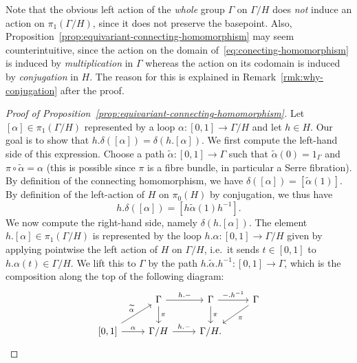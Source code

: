 \documentclass[AHL,Unicode,published]{cedram}
\begin{document}
\begin{rema}\label{rmk:multiplication-vs-conjugation}
Note that the obvious left action of the \emph{whole} group $\Gamma$ on $\Gamma/H$ does \emph{not} induce an action on $\pi_{1}(\Gamma/H)$, since it does not preserve the basepoint. Also, Proposition~\ref{prop:equivariant-connecting-homomorphism} may seem counterintuitive, since the action on the domain of~\eqref{eq:conecting-homomorphism} is induced by \emph{multiplication} in $\Gamma$ whereas the action on its codomain is induced by \emph{conjugation} in $H$. The reason for this is explained in Remark~\ref{rmk:why-conjugation} after the proof.
\end{rema}

\begin{proof}[Proof of Proposition~\ref{prop:equivariant-connecting-homomorphism}]
Let $[\alpha] \in \pi_{1}(\Gamma/H)$ represented by a loop $\alpha \colon [0,1] \to \Gamma/H$ and let $h \in H$. Our goal is to show that $h.\delta([\alpha]) = \delta(h.[\alpha])$. We first compute the left-hand side of this expression. Choose a path $\widetilde{\alpha} \colon [0,1] \to \Gamma$ such that $\widetilde{\alpha}(0) = 1_\Gamma$ and $\pi \circ \widetilde{\alpha} = \alpha$ (this is possible since $\pi$ is a fibre bundle, in particular a Serre fibration). By definition of the connecting homomorphism, we have $\delta([\alpha]) = [\widetilde{\alpha}(1)]$. By definition of the left-action of $H$ on $\pi_{0}(H)$ by conjugation, we thus have
\begin{equation}\label{eq:equivariance-left}
h.\delta([\alpha]) = \left[h \widetilde{\alpha}(1) h^{-1}\right].
\end{equation}
We now compute the right-hand side, namely $\delta(h.[\alpha])$. The element $h.[\alpha] \in \pi_{1}(\Gamma/H)$ is represented by the loop $h.\alpha \colon [0,1] \to \Gamma/H$ given by applying pointwise the left action of $H$ on $\Gamma/H$, i.e.~it sends $t \in [0,1]$ to $h.\alpha(t) \in \Gamma/H$. We lift this to $\Gamma$ by the path $h.\widetilde{\alpha}.h^{-1} \colon [0,1] \to \Gamma$, which is the composition along the top of the following diagram:
\begin{equation}\label{eq:lifting-alpha}
\begin{tikzcd}
& \Gamma \ar[r,"h.-"] \ar[d,"\pi"] & \Gamma \ar[d,"\pi"] \ar[r,"-.h^{-1}"] & \Gamma \ar[dl,"\pi"] \\
{[0,1]} \ar[r,"\alpha"] \ar[ur,"\widetilde{\alpha}"] & \Gamma/H \ar[r,"h.-"] & \Gamma/H.
\end{tikzcd}
\end{equation}

\end{proof}
\end{document}
